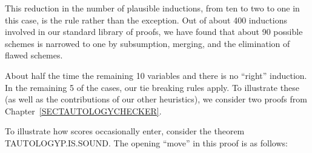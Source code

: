 \documentclass[10pt]{book}
\begin{document}
This  reduction in the number of plausible inductions, from ten
to two to one in this case, is the rule rather than the
exception.  Out of about 400 inductions involved in our standard library
of proofs, we have found that about 90%
possible schemes is narrowed to one by subsumption, merging,
and the elimination of flawed schemes.

About half the time the remaining 10%
variables and there is no ``right'' induction.  In the remaining 5%
of the cases, our tie breaking rules apply.  To illustrate these
(as well as the contributions of our other heuristics), we  consider
two proofs  from Chapter~\ref{SECTAUTOLOGYCHECKER}.

To illustrate how scores occasionally enter, consider the
theorem TAUTOLOGYP.IS.SOUND.
The opening ``move'' in this proof is as follows:
\end{document}
